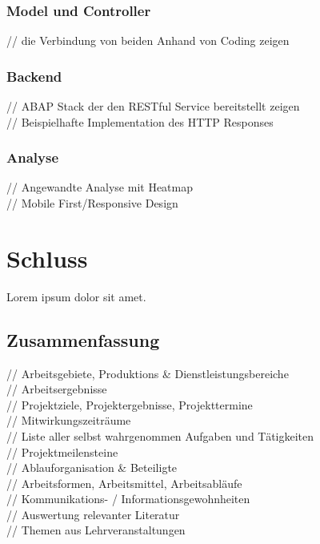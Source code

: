 \documentclass[12pt,a4paper,bibliography=totocnumbered,listof=totocnumbered]{scrartcl}
\begin{document}
\subsubsection{Model und Controller}
// die Verbindung von beiden Anhand von Coding zeigen\\

\subsubsection{Backend}
// ABAP Stack der den RESTful Service bereitstellt zeigen\\
// Beispielhafte Implementation des HTTP Responses\\

\subsubsection{Analyse}
// Angewandte Analyse mit Heatmap\\
// Mobile First/Responsive Design\\

\pagebreak

\section{Schluss}
Lorem ipsum dolor sit amet.

\subsection{Zusammenfassung}
// Arbeitsgebiete, Produktions \& Dienstleistungsbereiche\\
// Arbeitsergebnisse\\
// Projektziele, Projektergebnisse, Projekttermine\\
// Mitwirkungszeiträume\\
// Liste aller selbst wahrgenommen Aufgaben und Tätigkeiten\\
// Projektmeilensteine\\
// Ablauforganisation \& Beteiligte\\
// Arbeitsformen, Arbeitsmittel, Arbeitsabläufe\\
// Kommunikations- / Informationsgewohnheiten\\
// Auswertung relevanter Literatur\\
// Themen aus Lehrveranstaltungen\\
\end{document}
